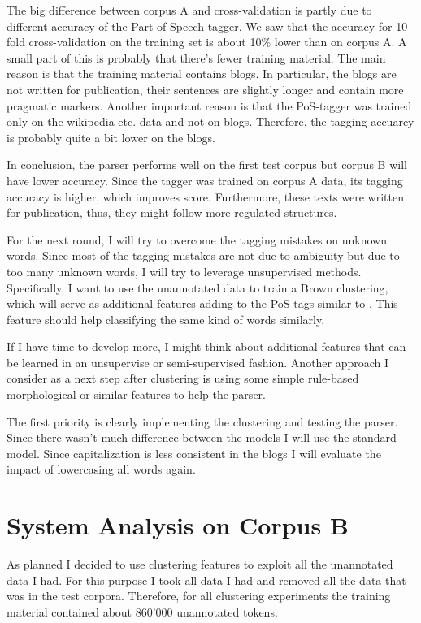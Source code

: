\documentclass[11pt,letterpaper, covington]{article}
\begin{document}
The big difference between corpus A and cross-validation is partly due to different accuracy of the Part-of-Speech tagger. We saw that the accuracy for 10-fold cross-validation on the training set is about 10\% lower than on corpus A. A small part of this is probably that there's fewer training material. The main reason is that the training material contains blogs. In particular, the blogs are not written for publication, their sentences are slightly longer and contain more pragmatic markers. Another important reason is that the PoS-tagger was trained only on the wikipedia etc. data and not on blogs. Therefore, the tagging accuarcy is probably quite a bit lower on the blogs. 

In conclusion, the parser performs well on the first test corpus but corpus B will have lower accuracy. Since the tagger was trained on corpus A data, its tagging accuracy is higher, which improves score. Furthermore, these texts were written for publication, thus, they might follow more regulated structures. 

For the next round, I will try to overcome the tagging mistakes on unknown words. Since most of the tagging mistakes are not due to ambiguity but due to too many unknown words, I will try to leverage unsupervised methods. Specifically, I want to use the unannotated data to train a Brown clustering, which will serve as additional features adding to the PoS-tags similar to \citet{KCC08}. This feature should help classifying the same kind of words similarly. 

If I have time to develop more, I might think about additional features that can be learned in an unsupervise or semi-supervised fashion. Another approach I consider as a next step after clustering is using some simple rule-based morphological or similar features to help the parser. 

The first priority is clearly implementing the clustering and testing the parser. Since there wasn't much difference between the models I will use the standard model. Since capitalization is less consistent in the blogs I will evaluate the impact of lowercasing all words again. 

\section{System Analysis on Corpus B}

As planned I decided to use clustering features to exploit all the unannotated data I had.
For this purpose I took all data I had and removed all the data that was in the test corpora. Therefore, for all clustering experiments the training material contained about 860'000 unannotated tokens.
\end{document}
